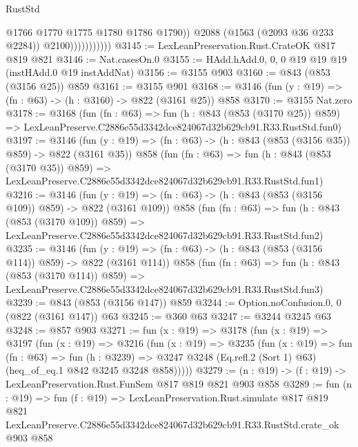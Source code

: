 \begin{lexlean}{RustStd}
\begin{coremodule}
                              @1766
                              @1770
                              @1775
                              @1780
                              @1786
                              @1790))
                          @2088
                          (@1563 (@2093 @36 @233 @2284))
                          @2100)))))))))))
@3145 := LexLeanPreservation.Rust.CrateOK @817 @819 @821
@3146 := Nat.casesOn.{0}
@3155 := HAdd.hAdd.{0, 0, 0} @19 @19 @19 (instHAdd.{0} @19 instAddNat)
@3156 := @3155 @903
@3160 := @843 (@853 (@3156 @25)) @859
@3161 := @3155 @901
@3168 := @3146 (fun (y : @19) => (fn : @63) -> (h : @3160) -> @822 (@3161 @25)) @858
@3170 := @3155 Nat.zero
@3178 := @3168
    (fun (fn : @63) =>
    fun (h : @843 (@853 (@3170 @25)) @859) =>
    LexLeanPreserve.C2886e55d3342dce824067d32b629cb91.R33.RustStd.fun0)
@3197 := @3146
    (fun (y : @19) => (fn : @63) -> (h : @843 (@853 (@3156 @35)) @859) -> @822 (@3161 @35))
    @858
    (fun (fn : @63) =>
    fun (h : @843 (@853 (@3170 @35)) @859) =>
    LexLeanPreserve.C2886e55d3342dce824067d32b629cb91.R33.RustStd.fun1)
@3216 := @3146
    (fun (y : @19) => (fn : @63) -> (h : @843 (@853 (@3156 @109)) @859) -> @822 (@3161 @109))
    @858
    (fun (fn : @63) =>
    fun (h : @843 (@853 (@3170 @109)) @859) =>
    LexLeanPreserve.C2886e55d3342dce824067d32b629cb91.R33.RustStd.fun2)
@3235 := @3146
    (fun (y : @19) => (fn : @63) -> (h : @843 (@853 (@3156 @114)) @859) -> @822 (@3161 @114))
    @858
    (fun (fn : @63) =>
    fun (h : @843 (@853 (@3170 @114)) @859) =>
    LexLeanPreserve.C2886e55d3342dce824067d32b629cb91.R33.RustStd.fun3)
@3239 := @843 (@853 (@3156 @147)) @859
@3244 := Option.noConfusion.{0, 0} (@822 (@3161 @147)) @63
@3245 := @360 @63
@3247 := @3244 @3245 @63
@3248 := @857 @903
@3271 := fun (x : @19) =>
  @3178
    (fun (x : @19) =>
    @3197
      (fun (x : @19) =>
      @3216
        (fun (x : @19) =>
        @3235
          (fun (x : @19) =>
          fun (fn : @63) =>
          fun (h : @3239) =>
          @3247 @3248 (Eq.refl.{2} (Sort 1) @63) (heq_of_eq.{1} @842 @3245 @3248 @858)))))
@3279 := (n : @19) -> (f : @19) -> LexLeanPreservation.Rust.FunSem @817 @819 @821 @903 @858
@3289 := fun (n : @19) =>
  fun (f : @19) =>
  LexLeanPreservation.Rust.simulate
    @817
    @819
    @821
    LexLeanPreserve.C2886e55d3342dce824067d32b629cb91.R33.RustStd.crate_ok
    @903
    @858
\end{coremodule}
\end{lexlean}

